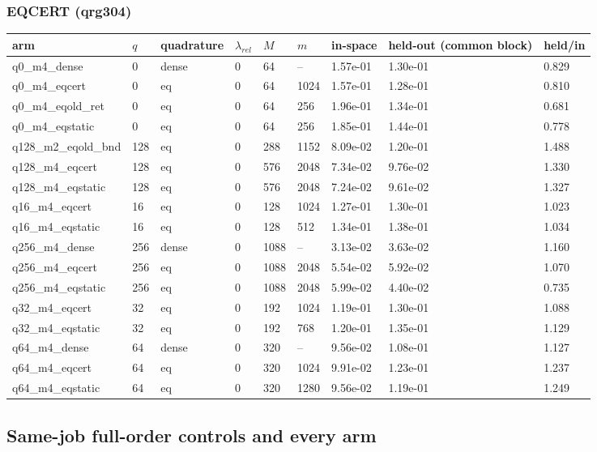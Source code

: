 \documentclass[11pt]{article}
\begin{document}
\subsubsection{EQCERT (qrg304)}
\begin{table}[htbp]\centering\small
\begin{tabular}{lllllllll}\hline
arm & $q$ & quadrature & $\lambda_{rel}$ & $M$ & $m$ & in-space & held-out (common block) & held/in \\ \hline
q0\_m4\_dense & 0 & dense & 0 & 64 & -- & 1.57e-01 & 1.30e-01 & 0.829 \\
q0\_m4\_eqcert & 0 & eq & 0 & 64 & 1024 & 1.57e-01 & 1.28e-01 & 0.810 \\
q0\_m4\_eqold\_ret & 0 & eq & 0 & 64 & 256 & 1.96e-01 & 1.34e-01 & 0.681 \\
q0\_m4\_eqstatic & 0 & eq & 0 & 64 & 256 & 1.85e-01 & 1.44e-01 & 0.778 \\
q128\_m2\_eqold\_bnd & 128 & eq & 0 & 288 & 1152 & 8.09e-02 & 1.20e-01 & 1.488 \\
q128\_m4\_eqcert & 128 & eq & 0 & 576 & 2048 & 7.34e-02 & 9.76e-02 & 1.330 \\
q128\_m4\_eqstatic & 128 & eq & 0 & 576 & 2048 & 7.24e-02 & 9.61e-02 & 1.327 \\
q16\_m4\_eqcert & 16 & eq & 0 & 128 & 1024 & 1.27e-01 & 1.30e-01 & 1.023 \\
q16\_m4\_eqstatic & 16 & eq & 0 & 128 & 512 & 1.34e-01 & 1.38e-01 & 1.034 \\
q256\_m4\_dense & 256 & dense & 0 & 1088 & -- & 3.13e-02 & 3.63e-02 & 1.160 \\
q256\_m4\_eqcert & 256 & eq & 0 & 1088 & 2048 & 5.54e-02 & 5.92e-02 & 1.070 \\
q256\_m4\_eqstatic & 256 & eq & 0 & 1088 & 2048 & 5.99e-02 & 4.40e-02 & 0.735 \\
q32\_m4\_eqcert & 32 & eq & 0 & 192 & 1024 & 1.19e-01 & 1.30e-01 & 1.088 \\
q32\_m4\_eqstatic & 32 & eq & 0 & 192 & 768 & 1.20e-01 & 1.35e-01 & 1.129 \\
q64\_m4\_dense & 64 & dense & 0 & 320 & -- & 9.56e-02 & 1.08e-01 & 1.127 \\
q64\_m4\_eqcert & 64 & eq & 0 & 320 & 1024 & 9.91e-02 & 1.23e-01 & 1.237 \\
q64\_m4\_eqstatic & 64 & eq & 0 & 320 & 1280 & 9.56e-02 & 1.19e-01 & 1.249 \\
\hline\end{tabular}
\end{table}
\subsection{Same-job full-order controls and every arm}
\end{document}
